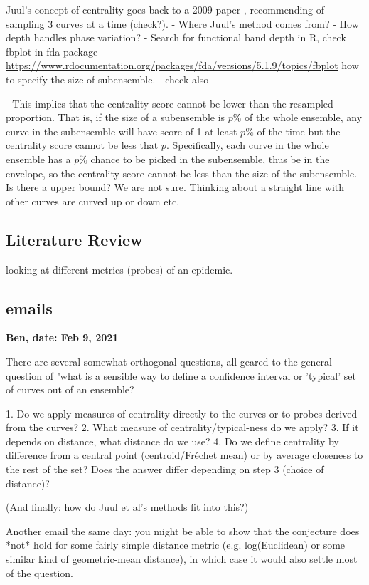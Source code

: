 \documentclass[12pt]{article}
\theoremstyle{definition} %
\begin{document}
Juul's concept of centrality goes back to a 2009 paper \cite{lopez2009concept}, recommending of sampling 3 curves at a time (check?). 
- Where Juul's method comes from?
- How depth handles phase variation?
- Search for functional band depth in R, check fbplot in fda package \url{https://www.rdocumentation.org/packages/fda/versions/5.1.9/topics/fbplot} how to specify the size of subensemble.
- check also \cite{sun2012exact}

- This implies that the centrality score cannot be lower than the resampled proportion. 
That is, if the size of a subensemble is $p\%$ of the whole ensemble, any curve in the subensemble will have score of 1 at least $p\%$ of the time but the centrality score cannot be less that $p$. Specifically, each curve in the whole ensemble has a $p\%$ chance to be picked in the subensemble, thus be in the envelope, so the centrality score cannot be less than the size of the subensemble.     
- Is there a upper bound? We are not sure. Thinking about a straight line with other curves are curved up or down etc.
\subsection{Literature Review}
\citep{juul2021fixed}

\cite{probert2016decision} looking at different metrics (probes) of an epidemic.
\subsection{emails}

{\bf Ben,  
date: Feb 9, 2021}

There are several somewhat orthogonal questions, all geared to the general question of "what is a sensible way to define a confidence interval or 'typical' set of curves out of an ensemble?

 1. Do we apply measures of centrality directly to the curves or to
probes derived from the curves?
 2.  What measure of centrality/typical-ness do we apply?
 3.  If it depends on distance, what distance do we use?
 4. Do we define centrality by difference from a central point
(centroid/Fréchet mean) or by average closeness to the rest of the
set? Does the answer differ depending on step 3 (choice of distance)?

(And finally: how do Juul et al's methods fit into this?)

Another email the same day:
you might be able to show that the conjecture does *not* hold for some fairly simple distance metric (e.g. log(Euclidean) or some similar kind of geometric-mean distance), in which case it would also settle most of the question.
\end{document}

